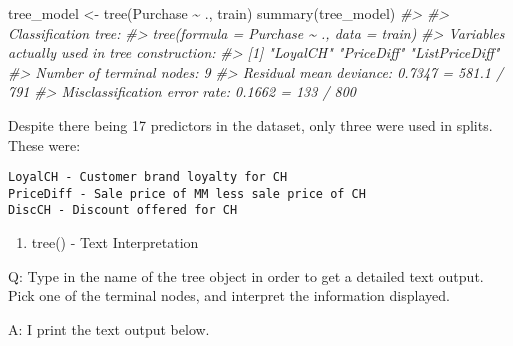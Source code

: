 \documentclass[
]{book}
\newenvironment{Shaded}{\begin{snugshade}}{\end{snugshade}}
\newcommand{\CommentTok}[1]{\textcolor[rgb]{0.56,0.35,0.01}{\textit{#1}}}
\newcommand{\FunctionTok}[1]{\textcolor[rgb]{0.00,0.00,0.00}{#1}}
\newcommand{\NormalTok}[1]{#1}
\newcommand{\OtherTok}[1]{\textcolor[rgb]{0.56,0.35,0.01}{#1}}
\newcommand{\SpecialCharTok}[1]{\textcolor[rgb]{0.00,0.00,0.00}{#1}}
\providecommand{\tightlist}{%
  \setlength{\itemsep}{0pt}\setlength{\parskip}{0pt}}
\begin{document}
\begin{Shaded}
\begin{Highlighting}[]
\NormalTok{tree\_model }\OtherTok{\textless{}{-}} \FunctionTok{tree}\NormalTok{(Purchase }\SpecialCharTok{\textasciitilde{}}\NormalTok{ ., train)}
\FunctionTok{summary}\NormalTok{(tree\_model)}
\CommentTok{\#\textgreater{} }
\CommentTok{\#\textgreater{} Classification tree:}
\CommentTok{\#\textgreater{} tree(formula = Purchase \textasciitilde{} ., data = train)}
\CommentTok{\#\textgreater{} Variables actually used in tree construction:}
\CommentTok{\#\textgreater{} [1] "LoyalCH"       "PriceDiff"     "ListPriceDiff"}
\CommentTok{\#\textgreater{} Number of terminal nodes:  9 }
\CommentTok{\#\textgreater{} Residual mean deviance:  0.7347 = 581.1 / 791 }
\CommentTok{\#\textgreater{} Misclassification error rate: 0.1662 = 133 / 800}
\end{Highlighting}
\end{Shaded}

Despite there being 17 predictors in the dataset, only three were used in splits. These were:

\begin{verbatim}
LoyalCH - Customer brand loyalty for CH
PriceDiff - Sale price of MM less sale price of CH
DiscCH - Discount offered for CH
\end{verbatim}

\begin{enumerate}
\def\labelenumi{(\alph{enumi})}
\setcounter{enumi}{2}
\tightlist
\item
  tree() - Text Interpretation
\end{enumerate}

Q: Type in the name of the tree object in order to get a detailed text output. Pick one of the terminal nodes, and interpret the information displayed.

A: I print the text output below.
\end{document}
